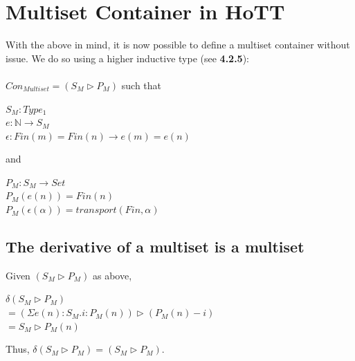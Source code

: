 \documentclass[12pt]{report}
\begin{document}
\section{Multiset Container in HoTT}
With the above in mind, it is now possible to define a multiset container without issue. We do so using a higher inductive type\cite{lyon} (see \textbf{4.2.5}):\\
\\
$Con_{Multiset} = (S_M \rhd P_M)$ such that 
\begin{center}
$S_M : Type_1$\\
$e : \mathbb{N} \to S_M$\\
$\epsilon : Fin(m) = Fin(n) \to e(m) = e(n) $\\
\end{center}
and
\begin{center}
$P_M : S_M \to Set$\\
$P_M(e(n)) = Fin(n)$\\
$P_M(\epsilon(\alpha)) = transport(Fin, \alpha)$\\

\end{center}
\subsection{The derivative of a multiset is a multiset}
Given $(S_M \rhd P_M)$ as above,
\begin{center}
$\delta (S_M \rhd P_M)$\\
$= (\Sigma e(n) : S_M . i : P_M (n)) \rhd (P_M (n) -i)$\\
$= S_M \rhd P_M (n)$
\end{center}
Thus, $\delta (S_M \rhd P_M) = (S_M \rhd P_M)$.
\end{document}
